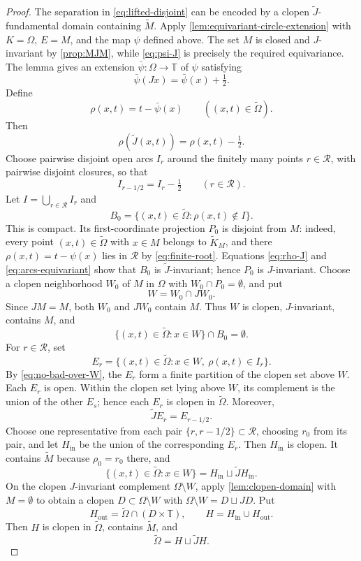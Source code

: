 \documentclass[reqno,12pt]{amsart}
\newcommand{\Torus}{\mathbb T}
\numberwithin{equation}{section}
\begin{document}
\begin{proof}
The separation in \eqref{eq:lifted-disjoint} can be encoded by a clopen
$\widetilde J$-fundamental domain containing $\widetilde M$.
Apply \cref{lem:equivariant-circle-extension} with $K=\Omega$, $E=M$,
and the map $\psi$ defined above. The set $M$ is closed and
$J$-invariant by \cref{prop:MJM}, while \eqref{eq:psi-J} is precisely the
required equivariance. The lemma gives an extension
$\bar\psi:\Omega\to\Torus$ of $\psi$ satisfying
\[
 \bar\psi(Jx)=\bar\psi(x)+\tfrac12.
\]
Define
\[
 \rho(x,t)=t-\bar\psi(x)
 \qquad((x,t)\in\widetilde\Omega).
\]
Then
\begin{equation}\label{eq:rho-J}
 \rho(\widetilde J(x,t))=\rho(x,t)-\tfrac12.
\end{equation}
Choose pairwise disjoint open arcs $I_r$ around the finitely many points
$r\in\mathcal R$, with pairwise disjoint closures, so that
\begin{equation}\label{eq:arcs-equivariant}
 I_{r-1/2}=I_r-\tfrac12
 \qquad(r\in\mathcal R).
\end{equation}
Let $I=\bigcup_{r\in\mathcal R}I_r$ and
\[
 B_0=\{(x,t)\in\widetilde\Omega:\rho(x,t)\notin I\}.
\]
This is compact. Its first-coordinate projection $P_0$ is disjoint from $M$:
indeed, every point $(x,t)\in\widetilde\Omega$ with $x\in M$ belongs to
$\widetilde K_M$, and there $\rho(x,t)=t-\psi(x)$ lies in $\mathcal R$ by
\eqref{eq:finite-root}. Equations \eqref{eq:rho-J} and
\eqref{eq:arcs-equivariant} show that $B_0$ is $\widetilde J$-invariant;
hence $P_0$ is $J$-invariant. Choose a clopen neighborhood
$W_0$ of $M$ in $\Omega$ with $W_0\cap P_0=\emptyset$, and put
\[
 W=W_0\cap JW_0.
\]
Since $JM=M$, both $W_0$ and $JW_0$ contain $M$.  Thus $W$ is clopen,
$J$-invariant, contains $M$, and
\begin{equation}\label{eq:no-bad-over-W}
 \{(x,t)\in\widetilde\Omega:x\in W\}\cap B_0=\emptyset.
\end{equation}
For $r\in\mathcal R$, set
\[
 E_r=\{(x,t)\in\widetilde\Omega:x\in W,\ \rho(x,t)\in I_r\}.
\]
By \eqref{eq:no-bad-over-W}, the $E_r$ form a finite partition of the clopen
set above $W$. Each $E_r$ is open. Within the clopen set lying above $W$, its complement
is the union of the other $E_s$; hence each $E_r$ is clopen in
$\widetilde\Omega$. Moreover,
\[
 \widetilde JE_r=E_{r-1/2}.
\]
Choose one representative from each pair
$\{r,r-1/2\}\subset\mathcal R$, choosing $r_0$ from its pair, and let
$H_{\mathrm{in}}$ be the union of the corresponding $E_r$. Then
$H_{\mathrm{in}}$ is clopen.  It contains $\widetilde M$ because
$\rho_0=r_0$ there, and
\[
 \{(x,t)\in\widetilde\Omega:x\in W\}
 =H_{\mathrm{in}}\sqcup\widetilde JH_{\mathrm{in}}.
\]
On the clopen $J$-invariant complement $\Omega\setminus W$, apply
\cref{lem:clopen-domain} with $M=\emptyset$ to obtain a clopen
$D\subset\Omega\setminus W$ with
$\Omega\setminus W=D\sqcup JD$. Put
\[
 H_{\mathrm{out}}
 =\widetilde\Omega\cap(D\times\Torus),
 \qquad
 H=H_{\mathrm{in}}\cup H_{\mathrm{out}}.
\]
Then $H$ is clopen in $\widetilde\Omega$, contains $\widetilde M$, and
\begin{equation}\label{eq:Hfundamental}
 \widetilde\Omega=H\sqcup\widetilde JH.
\end{equation}


\end{proof}
\end{document}
